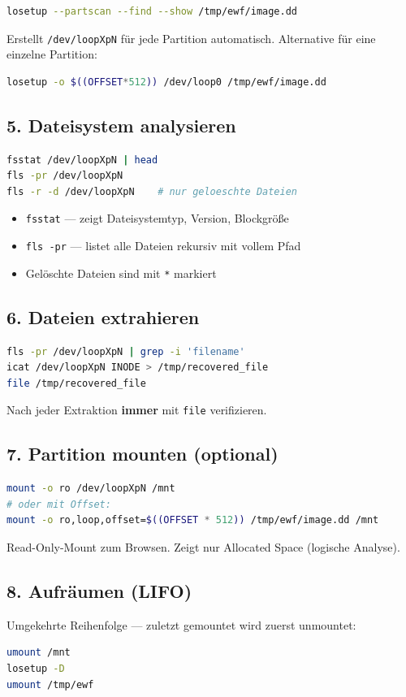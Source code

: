 \begin{lstlisting}[language=bash]
losetup --partscan --find --show /tmp/ewf/image.dd
\end{lstlisting}

Erstellt \texttt{/dev/loopXpN} für jede Partition automatisch.
Alternative für eine einzelne Partition:

\begin{lstlisting}[language=bash]
losetup -o $((OFFSET*512)) /dev/loop0 /tmp/ewf/image.dd
\end{lstlisting}

\subsection{5. Dateisystem analysieren}

\begin{lstlisting}[language=bash]
fsstat /dev/loopXpN | head
fls -pr /dev/loopXpN
fls -r -d /dev/loopXpN    # nur geloeschte Dateien
\end{lstlisting}

\begin{itemize}
    \item \texttt{fsstat} — zeigt Dateisystemtyp, Version, Blockgröße
    \item \texttt{fls -pr} — listet alle Dateien rekursiv mit vollem Pfad
    \item Gelöschte Dateien sind mit \texttt{*} markiert
\end{itemize}

\subsection{6. Dateien extrahieren}

\begin{lstlisting}[language=bash]
fls -pr /dev/loopXpN | grep -i 'filename'
icat /dev/loopXpN INODE > /tmp/recovered_file
file /tmp/recovered_file
\end{lstlisting}

Nach jeder Extraktion \textbf{immer} mit \texttt{file} verifizieren.

\subsection{7. Partition mounten (optional)}

\begin{lstlisting}[language=bash]
mount -o ro /dev/loopXpN /mnt
# oder mit Offset:
mount -o ro,loop,offset=$((OFFSET * 512)) /tmp/ewf/image.dd /mnt
\end{lstlisting}

Read-Only-Mount zum Browsen.
Zeigt nur Allocated Space (logische Analyse).

\subsection{8. Aufräumen (LIFO)}

Umgekehrte Reihenfolge — zuletzt gemountet wird zuerst unmountet:

\begin{lstlisting}[language=bash]
umount /mnt
losetup -D
umount /tmp/ewf
\end{lstlisting}
